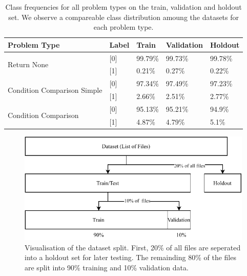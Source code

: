 \begin{table}[]
    \begin{tabularx}{\textwidth}{@{}lXXXX@{}}
    \toprule
    Problem Type                                 & Label& Train & Validation & Holdout \\ \midrule 
    \multirow{2}{*}{Return None}                 & [0] & 99.79\%  & 99.73\% & 99.78\%  \\
                                                 & [1] & 0.21\%   & 0.27\%  & 0.22\%    \\ \midrule
    \multirow{2}{*}{Condition Comparison Simple} & [0] & 97.34\%   &  97.49\%  & 97.23\%  \\
                                                 & [1] & 2.66\%   & 2.51\% & 2.77\%    \\ \midrule
    \multirow{2}{*}{Condition Comparison}        & [0] & 95.13\%  & 95.21\%  & 94.9\%  \\
                                                 & [1] & 4.87\%   & 4.79\%  & 5.1\%    \\ \bottomrule
    \end{tabularx}
    \caption[Class frequencies for all problem types.]{Class frequencies for all problem types on the train, validation and holdout set. We observe a compareable class distribution amoung the datasets for each problem type.}
    \label{tab:class_distribution}
\end{table}


\begin{figure}
    \includegraphics[width=1\textwidth]{img/ML/Data_split.pdf}
    \caption[Visualisation of the dataset split.]{Visualisation of the dataset split. First, 20\% of all files are seperated into a holdout set for later testing. The remainding 80\% of the files are split into 90\% training and 10\% validation data. }
    \label{fig:data_split}
\end{figure}

